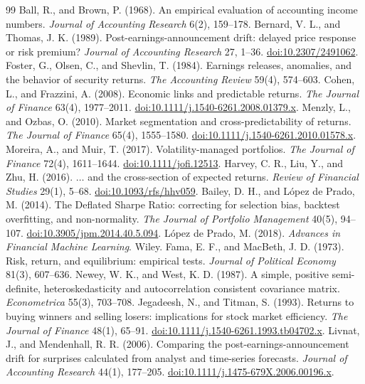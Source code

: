\documentclass[11pt,a4paper]{article}
\theoremstyle{plain}
\theoremstyle{definition}
\begin{document}
\begin{thebibliography}{99}
\small
{} Ball, R., and Brown, P. (1968). An empirical evaluation of accounting income numbers. \textit{Journal of Accounting Research} 6(2), 159--178.
 Bernard, V. L., and Thomas, J. K. (1989). Post-earnings-announcement drift: delayed price response or risk premium? \textit{Journal of Accounting Research} 27, 1--36. \href{https://doi.org/10.2307/2491062}{doi:10.2307/2491062}.
 Foster, G., Olsen, C., and Shevlin, T. (1984). Earnings releases, anomalies, and the behavior of security returns. \textit{The Accounting Review} 59(4), 574--603.
 Cohen, L., and Frazzini, A. (2008). Economic links and predictable returns. \textit{The Journal of Finance} 63(4), 1977--2011. \href{https://doi.org/10.1111/j.1540-6261.2008.01379.x}{doi:10.1111/j.1540-6261.2008.01379.x}.
 Menzly, L., and Ozbas, O. (2010). Market segmentation and cross-predictability of returns. \textit{The Journal of Finance} 65(4), 1555--1580. \href{https://doi.org/10.1111/j.1540-6261.2010.01578.x}{doi:10.1111/j.1540-6261.2010.01578.x}.
 Moreira, A., and Muir, T. (2017). Volatility-managed portfolios. \textit{The Journal of Finance} 72(4), 1611--1644. \href{https://doi.org/10.1111/jofi.12513}{doi:10.1111/jofi.12513}.
 Harvey, C. R., Liu, Y., and Zhu, H. (2016). $\ldots$ and the cross-section of expected returns. \textit{Review of Financial Studies} 29(1), 5--68. \href{https://doi.org/10.1093/rfs/hhv059}{doi:10.1093/rfs/hhv059}.
 Bailey, D. H., and L\'opez de Prado, M. (2014). The Deflated Sharpe Ratio: correcting for selection bias, backtest overfitting, and non-normality. \textit{The Journal of Portfolio Management} 40(5), 94--107. \href{https://doi.org/10.3905/jpm.2014.40.5.094}{doi:10.3905/jpm.2014.40.5.094}.
 L\'opez de Prado, M. (2018). \textit{Advances in Financial Machine Learning}. Wiley.
 Fama, E. F., and MacBeth, J. D. (1973). Risk, return, and equilibrium: empirical tests. \textit{Journal of Political Economy} 81(3), 607--636.
 Newey, W. K., and West, K. D. (1987). A simple, positive semi-definite, heteroskedasticity and autocorrelation consistent covariance matrix. \textit{Econometrica} 55(3), 703--708.
 Jegadeesh, N., and Titman, S. (1993). Returns to buying winners and selling losers: implications for stock market efficiency. \textit{The Journal of Finance} 48(1), 65--91. \href{https://doi.org/10.1111/j.1540-6261.1993.tb04702.x}{doi:10.1111/j.1540-6261.1993.tb04702.x}.
 Livnat, J., and Mendenhall, R. R. (2006). Comparing the post-earnings-announcement drift for surprises calculated from analyst and time-series forecasts. \textit{Journal of Accounting Research} 44(1), 177--205. \href{https://doi.org/10.1111/j.1475-679X.2006.00196.x}{doi:10.1111/j.1475-679X.2006.00196.x}.
\end{thebibliography}
\end{document}
